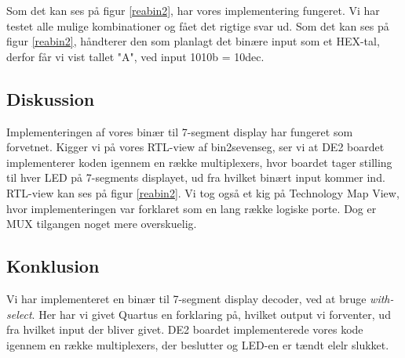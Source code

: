 \documentclass[../journal2.tex]{subfiles}
\begin{document}
Som det kan ses på figur \ref{reabin2}, har vores implementering fungeret. Vi har testet alle mulige kombinationer og fået det rigtige svar ud. Som det kan ses på figur \ref{reabin2}, håndterer den som planlagt det binære input som et HEX-tal, derfor får vi vist tallet "A", ved input 1010b = 10dec.

\subsection{Diskussion}

Implementeringen af vores binær til 7-segment display har fungeret som forvetnet. Kigger vi på vores RTL-view af bin2sevenseg, ser vi at DE2 boardet implementerer koden igennem en række multiplexers, hvor boardet tager stilling til hver LED på 7-segments displayet, ud fra hvilket binært input kommer ind. RTL-view kan ses på figur \ref{reabin2}. Vi tog også et kig på Technology Map View, hvor implementeringen var forklaret som en lang række logiske porte. Dog er MUX tilgangen noget mere overskuelig.  


\subsection{Konklusion}

Vi har implementeret en binær til 7-segment display decoder, ved at bruge \textit{with-select}. Her har vi givet Quartus en forklaring på, hvilket output vi forventer, ud fra hvilket input der bliver givet. DE2 boardet implementerede vores kode igennem en række multiplexers, der beslutter og LED-en er tændt elelr slukket. 
\end{document}

